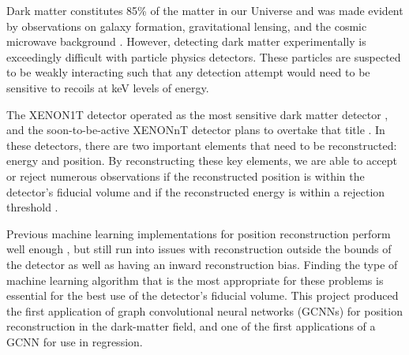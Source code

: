 \documentclass[thesis.tex]{subfiles}
\begin{document}
Dark matter constitutes 85\% of the matter in our Universe and was made evident by observations on galaxy formation, gravitational lensing, and the cosmic microwave background \cite{DM_Hist}.
However, detecting dark matter experimentally is exceedingly difficult with particle physics detectors.
These particles are suspected to be weakly interacting \cite{1TDM_DataAnalysis} such that any detection attempt would need to be sensitive to recoils at keV levels of energy.

\par The XENON1T detector operated as the most sensitive dark matter detector \cite{Xenon1t}, and the soon-to-be-active XENONnT detector plans to overtake that title \cite{nT_Projection}.
In these detectors, there are two important elements that need to be reconstructed: energy and position.
By reconstructing these key elements, we are able to accept or reject numerous observations if the reconstructed position is within the detector's fiducial volume and if the reconstructed energy is within a rejection threshold \cite{1TDM_DataAnalysis}.

\par Previous machine learning implementations for position reconstruction perform well enough \cite{Bart}, but still run into issues with reconstruction outside the bounds of the detector as well as having an inward reconstruction bias.
Finding the type of machine learning algorithm that is the most appropriate for these problems is essential for the best use of the detector's fiducial volume.
This project produced the first application of graph convolutional neural networks (GCNNs) for position reconstruction in the dark-matter field, and one of the first applications of a GCNN for use in regression.
\end{document}
